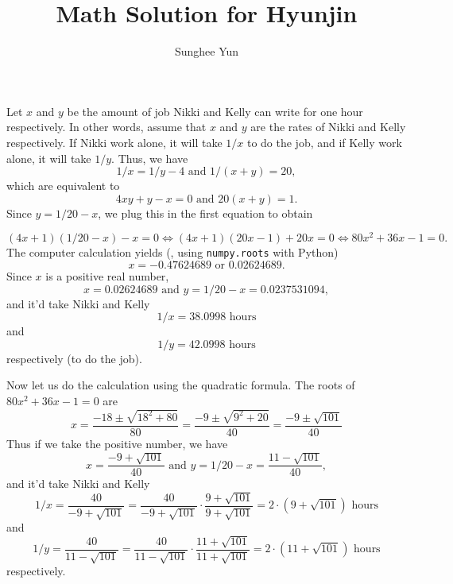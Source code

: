 \documentclass{article}
\title{Math Solution for Hyunjin}
\author{Sunghee Yun}
\begin{document}
\maketitle

Let $x$ and $y$ be the amount of job Nikki and Kelly can write for one hour respectively.
In other words, assume that $x$ and $y$ are the rates of Nikki and Kelly respectively.
If Nikki work alone, it will take $1/x$ to do the job, and if Kelly work alone, it will take $1/y$.
Thus, we have 
\begin{equation}
1/x = 1/y - 4
\mbox{ and }
1/(x+y) = 20,
\end{equation}
which are equivalent to 
\begin{equation}
4xy + y - x = 0
\mbox{ and }
20(x+y) = 1.
\end{equation}
Since $y= 1/20 -x$, we plug this in the first equation to obtain
\iffalse
\begin{equation}
(4x+1)(1/20 -x ) - x = 0 \Leftrightarrow 4x^2 +(-1/5 +1 + 1 ) x - 1/20 = 0 \Leftrightarrow 80 x^2 + 36 x - 1 = 0.
\end{equation}
\fi
\begin{equation}
(4x+1)(1/20 -x ) - x = 0 \Leftrightarrow (4x+1)(20x -1 ) +20x = 0 \Leftrightarrow 80x^2 + 36x -1 = 0.
\end{equation}
The computer calculation yields (\eg, using {\tt numpy.roots} with Python)
\begin{equation}
x = -0.47624689 \mbox{ or } 0.02624689.
\end{equation}
Since $x$ is a positive real number,
\begin{equation}
x = 0.02624689 \mbox{ and } y = 1/20 - x = 0.0237531094,
\end{equation}
and it'd take Nikki and Kelly 
\begin{equation}
1/x = 38.0998 \mbox{ hours}
\end{equation}
and
\begin{equation}
1/y = 42.0998 \mbox{ hours}
\end{equation}
respectively (to do the job).

Now let us do the calculation using the quadratic formula.
The roots of $80x^2 + 36x - 1=0$ are
\begin{equation}
x = \frac{-18 \pm \sqrt{18^2 + 80}}{80}
= \frac{-9 \pm \sqrt{9^2 + 20}}{40}
= \frac{-9 \pm \sqrt{101}}{40}
\end{equation}
Thus if we take the positive number, we have
\begin{equation}
x = \frac{-9+\sqrt{101}}{40} \mbox{ and }
y = 1/20 - x = 
\frac{11-\sqrt{101}}{40},
\end{equation}
and it'd take Nikki and Kelly 
\begin{equation}
1/x = \frac{40}{-9+\sqrt{101}}
= \frac{40}{-9+\sqrt{101}} \cdot
\frac{9+\sqrt{101}}{9+\sqrt{101}}
= 2\cdot (9+\sqrt{101})
\mbox{ hours}
\end{equation}
and
\begin{equation}
1/y = \frac{40}{11-\sqrt{101}}
= \frac{40}{11-\sqrt{101}}
\cdot \frac{11+\sqrt{101}}{11+\sqrt{101}}
= 2\cdot(11+\sqrt{101})
\mbox{ hours}
\end{equation}
respectively.
\end{document}
